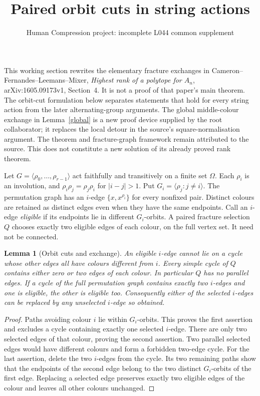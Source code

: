 \documentclass[11pt,a4paper]{article}
\title{Paired orbit cuts in string actions}
\author{Human Compression project: incomplete L044 common supplement}
\date{}
\newtheorem{lemma}[theorem]{Lemma}
\newcommand{\gen}[1]{\langle#1\rangle}
\begin{document}
\maketitle
This working section rewrites the elementary fracture exchanges in
Cameron--Fernandes--Leemans--Mixer, \emph{Highest rank of a polytope for
$A_n$}, arXiv:1605.09173v1, Section~4. It is not a proof of that paper's
main theorem. The orbit-cut formulation below separates statements that
hold for every string action from the later alternating-group arguments.
The global middle-colour exchange in Lemma~\ref{global} is a new
proof device supplied by the root collaborator; it replaces the local
detour in the source's square-normalisation argument. The theorem and
fracture-graph framework remain attributed to the source. This does
not constitute a new solution of its already proved rank theorem.

Let $G=\gen{\rho_0,\ldots,\rho_{r-1}}$ act faithfully and transitively
on a finite set $\Omega$. Each $\rho_i$ is an involution, and
$\rho_i\rho_j=\rho_j\rho_i$ for $|i-j|>1$. Put
$G_i=\gen{\rho_j:j\ne i}$. The permutation graph has an $i$-edge
$\{x,x^{\rho_i}\}$ for every nonfixed pair. Distinct colours are retained
as distinct edges even when they have the same endpoints. Call an
$i$-edge \emph{eligible} if its endpoints lie in different $G_i$-orbits.
A paired fracture selection $Q$ chooses exactly two eligible edges of
each colour, on the full vertex set. It need not be connected.

\begin{lemma}[Orbit cuts and exchange]\label{cut}
An eligible $i$-edge cannot lie on a cycle whose other edges all have
colours different from $i$. Every simple cycle of $Q$ contains either
zero or two edges of each colour. In particular $Q$ has no parallel
edges. If a cycle of the full permutation graph contains exactly two
$i$-edges and one is eligible, the other is eligible too. Consequently
either of the selected $i$-edges can be replaced by any unselected
$i$-edge so obtained.
\end{lemma}
\begin{proof}
Paths avoiding colour $i$ lie within $G_i$-orbits. This proves the
first assertion and excludes a cycle containing exactly one selected
$i$-edge. There are only two selected edges of that colour, proving
the second assertion. Two parallel selected edges would have different
colours and form a forbidden two-edge cycle. For the last assertion,
delete the two $i$-edges from the cycle. Its two remaining paths show
that the endpoints of the second edge belong to the two distinct
$G_i$-orbits of the first edge. Replacing a selected edge preserves
exactly two eligible edges of the colour and leaves all other colours
unchanged.
\end{proof}
\end{document}
